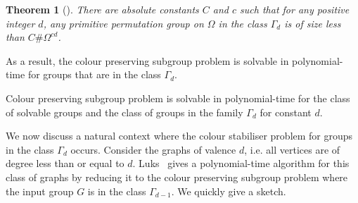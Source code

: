 \documentclass{article}
\newtheorem{theorem}{Theorem}[section]
\begin{document}
\begin{theorem}[\citeauthor*{babai82primitive}]\label{thm-palfy-gen}
  There are absolute constants $C$ and $c$ such that for any positive
  integer $d$, any primitive permutation group on $\Omega$ in the
  class $\Gamma_d$ is of size less than $C\# \Omega^{c d}$.
\end{theorem}

As a result, the colour preserving subgroup problem is solvable in
polynomial-time for groups that are in the class $\Gamma_d$.

\begin{lemma}\label{lem-colour-preserving-algo}
  Colour preserving subgroup problem is solvable in polynomial-time
  for the class of solvable groups and the class of groups in the
  family $\Gamma_d$ for constant $d$.
\end{lemma}


We now discuss a natural context where the colour stabiliser problem
for groups in the class $\Gamma_d$ occurs. Consider the graphs of
valence $d$, i.e. all vertices are of degree less than or equal to
$d$. Luks~\cite{luks82bounded} gives a polynomial-time algorithm for
this class of graphs by reducing it to the colour preserving subgroup
problem where the input group $G$ is in the class $\Gamma_{d-1}$. We
quickly give a sketch.
\end{document}
